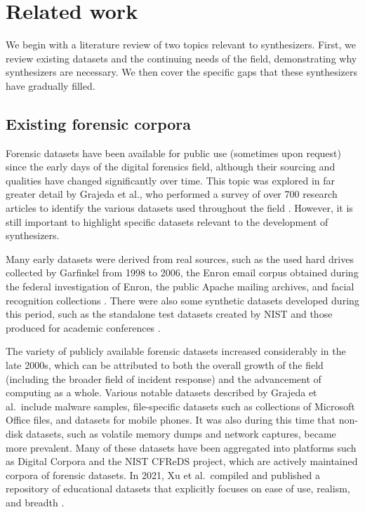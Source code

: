 \section{Related work}\label{related-work}

We begin with a literature review of two topics relevant to
synthesizers. First, we review existing datasets and the continuing
needs of the field, demonstrating why synthesizers are necessary. We
then cover the specific gaps that these synthesizers have gradually
filled.

\subsection{Existing forensic corpora}\label{existing-forensic-corpora}

Forensic datasets have been available for public use (sometimes upon
request) since the early days of the digital forensics field, although
their sourcing and qualities have changed significantly over time. This
topic was explored in far greater detail by Grajeda et al., who
performed a survey of over 700 research articles to identify the various
datasets used throughout the field
\citep{grajedaAvailabilityDatasetsDigital2017}. However, it is still
important to highlight specific datasets relevant to the development of
synthesizers.

Many early datasets were derived from real sources, such as the used
hard drives collected by Garfinkel from 1998 to 2006, the Enron email
corpus obtained during the federal investigation of Enron, the public
Apache mailing archives, and facial recognition collections
\citep{garfinkelForensicCorporaChallenge2007,grajedaAvailabilityDatasetsDigital2017,yannikosDataCorporaDigital2014,ricanekMORPHLongitudinalImage2006}.
There were also some synthetic datasets developed during this period,
such as the standalone test datasets created by NIST and those produced
for academic conferences \citep{woodsCreatingRealisticCorpora2011}.

The variety of publicly available forensic datasets increased
considerably in the late 2000s, which can be attributed to both the
overall growth of the field (including the broader field of incident
response) and the advancement of computing as a whole. Various notable
datasets described by Grajeda et al.~include malware samples,
file-specific datasets such as collections of Microsoft Office files,
and datasets for mobile phones. It was also during this time that
non-disk datasets, such as volatile memory dumps and network captures,
became more prevalent. Many of these datasets have been aggregated into
platforms such as Digital Corpora
\citep{garfinkelBringingScienceDigital2009,yannikosDataCorporaDigital2014}
and the NIST CFReDS project, which are actively maintained corpora of
forensic datasets. In 2021, Xu et al.~compiled and published a
repository of educational datasets that explicitly focuses on ease of
use, realism, and breadth \citep{xuDesigningSharedDigital2022}.

